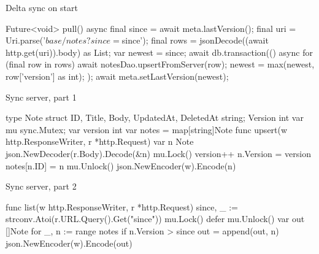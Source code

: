 \documentclass[10pt,aspectratio=169,t]{beamer}
\begin{document}
\begin{frame}[fragile,eyebrow=Task II]{Delta sync on start}
\begin{dart}
Future<void> pull() async {
  final since = await meta.lastVersion();
  final uri = Uri.parse('$base/notes?since=$since');
  final rows = jsonDecode((await http.get(uri)).body) as List;
  var newest = since;
  await db.transaction(() async {
    for (final row in rows) {
      await notesDao.upsertFromServer(row);
      newest = max(newest, row['version'] as int);
    }
  });
  await meta.setLastVersion(newest);
}
\end{dart}
\end{frame}

\begin{frame}[fragile,eyebrow=Reference]{Sync server, part 1}
\begin{golang}
type Note struct{ ID, Title, Body, UpdatedAt, DeletedAt string; Version int }
var mu sync.Mutex; var version int
var notes = map[string]Note{}
func upsert(w http.ResponseWriter, r *http.Request) {
  var n Note
  json.NewDecoder(r.Body).Decode(&n)
  mu.Lock()
  version++
  n.Version = version
  notes[n.ID] = n
  mu.Unlock()
  json.NewEncoder(w).Encode(n)
}
\end{golang}
\end{frame}

\begin{frame}[fragile,eyebrow=Reference]{Sync server, part 2}
\begin{golang}
func list(w http.ResponseWriter, r *http.Request) {
  since, _ := strconv.Atoi(r.URL.Query().Get("since"))
  mu.Lock()
  defer mu.Unlock()
  var out []Note
  for _, n := range notes {
    if n.Version > since {
      out = append(out, n)
    }
  }
  json.NewEncoder(w).Encode(out)
}
\end{golang}
\end{frame}
\end{document}
